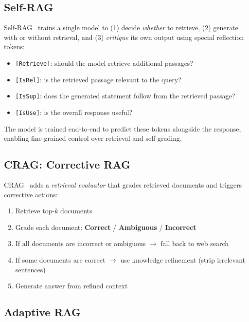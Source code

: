 \subsection{Self-RAG}
\label{self-rag}

Self-RAG~\cite{asai2023selfrag} trains a single model to (1) decide \emph{whether} to retrieve, (2) generate with or without retrieval, and (3) \emph{critique} its own output using special reflection tokens:

\begin{itemize}
  \item \texttt{[Retrieve]}: should the model retrieve additional passages?
  \item \texttt{[IsRel]}: is the retrieved passage relevant to the query?
  \item \texttt{[IsSup]}: does the generated statement follow from the retrieved passage?
  \item \texttt{[IsUse]}: is the overall response useful?
\end{itemize}

The model is trained end-to-end to predict these tokens alongside the response, enabling fine-grained control over retrieval and self-grading.

\subsection{CRAG: Corrective RAG}
\label{crag-corrective-rag}

CRAG~\cite{yan2024crag} adds a \emph{retrieval evaluator} that grades retrieved documents and triggers corrective actions:

\begin{enumerate}
  \item Retrieve top-$k$ documents
  \item Grade each document: \textbf{Correct} / \textbf{Ambiguous} / \textbf{Incorrect}
  \item If all documents are incorrect or ambiguous $\to$ fall back to web search
  \item If some documents are correct $\to$ use knowledge refinement (strip irrelevant sentences)
  \item Generate answer from refined context
\end{enumerate}

\subsection{Adaptive RAG}
\label{adaptive-rag}

